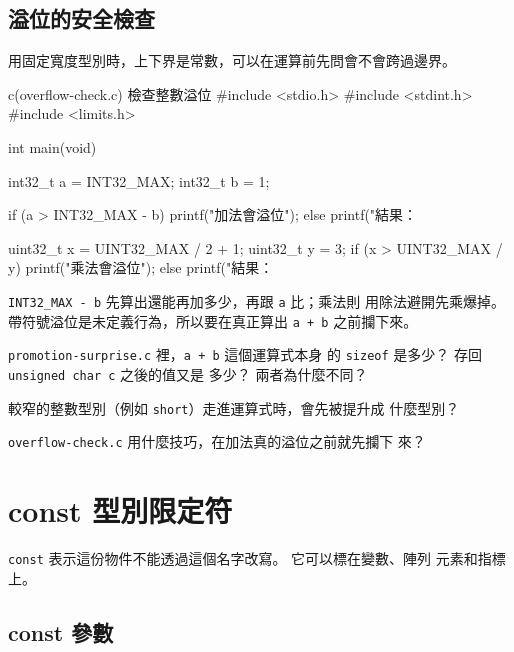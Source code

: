 \subsection{溢位的安全檢查}

用固定寬度型別時，上下界是常數，可以在運算前先問會不會跨過邊界。

\begin{example}{c}{(overflow-check.c) 檢查整數溢位}
#include <stdio.h>
#include <stdint.h>
#include <limits.h>

int main(void) {
    int32_t a = INT32_MAX;
    int32_t b = 1;

    if (a > INT32_MAX - b) {
        printf("加法會溢位\n");
    } else {
        printf("結果：%
    }

    uint32_t x = UINT32_MAX / 2 + 1;
    uint32_t y = 3;
    if (x > UINT32_MAX / y) {
        printf("乘法會溢位\n");
    } else {
        printf("結果：%
    }
}
\end{example}


\texttt{INT32\_MAX - b} 先算出還能再加多少，再跟 \texttt{a} 比；乘法則
用除法避開先乘爆掉。 帶符號溢位是未定義行為，所以要在真正算出
\texttt{a + b} 之前攔下來。

\begin{drills}[label=drills:decl-stdint]
\item \texttt{promotion-surprise.c} 裡，\texttt{a + b} 這個運算式本身
的 \texttt{sizeof} 是多少？ 存回 \texttt{unsigned char c} 之後的值又是
多少？ 兩者為什麼不同？
\item 較窄的整數型別（例如 \texttt{short}）走進運算式時，會先被提升成
什麼型別？
\item \texttt{overflow-check.c} 用什麼技巧，在加法真的溢位之前就先攔下
來？
\end{drills}

\section{const 型別限定符}
\label{sec:decl-const}

\texttt{const} 表示這份物件不能透過這個名字改寫。 它可以標在變數、陣列
元素和指標上。

\subsection{const 參數}

